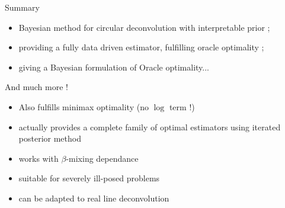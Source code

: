 \documentclass[10pt]{beamer}
\begin{document}
\begin{frame}{Summary}
\begin{itemize}
\item Bayesian method for circular deconvolution with interpretable prior ;
\item providing a fully data driven estimator, fulfilling oracle optimality ;
\item giving a Bayesian formulation of Oracle optimality...
\end{itemize}
And much more !
\begin{itemize}
\item Also fulfills minimax optimality (no $\log$ term !)
\item actually provides a complete family of optimal estimators using iterated posterior method
\item works with $\beta$-mixing dependance
\item suitable for severely ill-posed problems
\item can be adapted to real line deconvolution
\end{itemize}
\end{frame}

%


\end{document}
